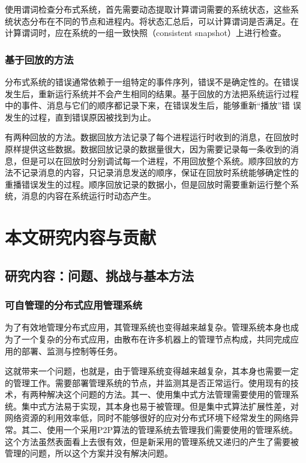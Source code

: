 使用谓词检查分布式系统，首先需要动态提取计算谓词需要的系统状态，这些系
统状态分布在不同的节点和进程内。将状态汇总后，可以计算谓词是否满足。在
计算谓词时，应在系统的一组一致快照（consistent snapshot）上进行检查。

\subsubsection*{基于回放的方法}

分布式系统的错误通常依赖于一组特定的事件序列，错误不是确定性的。在错误
发生后，重新运行系统并不会产生相同的结果。基于回放的方法把系统运行过程
中的事件、消息与它们的顺序都记录下来，在错误发生后，能够重新“播放”错
误发生的过程，直到错误原因被找到为止。

有两种回放的方法。数据回放方法记录了每个进程运行时收到的消息，在回放时
原样提供这些数据。数据回放记录的数据量很大，因为需要记录每一条收到的消
息，但是可以在回放时分别调试每一个进程，不用回放整个系统。顺序回放的方
法不记录消息的内容，只记录消息发送的顺序，保证在回放时系统能够确定性的
重播错误发生的过程。顺序回放记录的数据小，但是回放时需要重新运行整个系
统，消息的内容在系统运行时动态产生。

% 
% 
% 
% 
% 
% 
% 
% 
% 
% 


\section{本文研究内容与贡献}

\subsection{研究内容：问题、挑战与基本方法}

\subsubsection*{可自管理的分布式应用管理系统}

为了有效地管理分布式应用，其管理系统也变得越来越复杂。管理系统本身也成
为了一个复杂的分布式应用，由散布在许多机器上的管理节点构成，共同完成应
用的部署、监测与控制等任务。

这就带来一个问题，也就是，由于管理系统变得越来越复杂，其本身也需要一定
的管理工作。需要部署管理系统的节点，并监测其是否正常运行。使用现有的技
术，有两种解决这个问题的方法。其一、使用集中式方法管理需要使用的管理系
统。集中式方法易于实现，其本身也易于被管理。但是集中式算法扩展性差，对
网络资源的利用效率低，同时不能够很好的应对分布式环境下经常发生的网络异
常。其二、使用一个采用P2P算法的管理系统去管理我们需要使用的管理系统。
这个方法虽然表面看上去很有效，但是新采用的管理系统又递归的产生了需要被
管理的问题，所以这个方案并没有解决问题。


